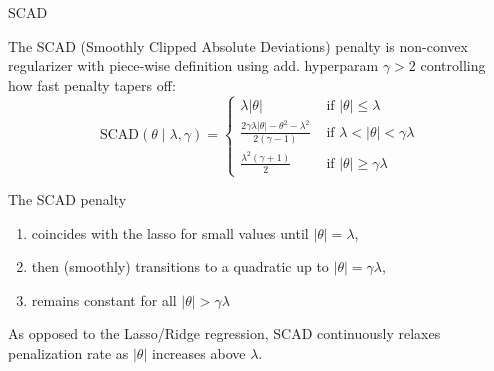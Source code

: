 \documentclass[11pt,compress,t,notes=noshow, xcolor=table]{beamer}
\begin{document}
\begin{vbframe}{SCAD }

The SCAD ({\footnotesize{Smoothly Clipped Absolute Deviations}}) penalty is non-convex regularizer with piece-wise definition using add. hyperparam $\gamma>2$ controlling how fast penalty tapers off:
$$
\text{SCAD}(\theta \mid \lambda, \gamma)= \begin{cases}\lambda|\theta| & \text { if }|\theta| \leq \lambda \\ \frac{2 \gamma \lambda|\theta|-\theta^2-\lambda^2}{2(\gamma-1)} & \text { if } \lambda<|\theta|<\gamma \lambda \\ \frac{\lambda^2(\gamma+1)}{2} & \text { if }|\theta| \geq \gamma \lambda\end{cases}
$$

The SCAD penalty 
\begin{enumerate}
    \item coincides with the lasso for small values until $|\theta|=\lambda$,
    \item then (smoothly) transitions to a quadratic up to $|\theta|=\gamma \lambda$,
    \item remains constant for all $|\theta|>\gamma \lambda$
\end{enumerate}
\vspace{0.3cm}
As opposed to the Lasso/Ridge regression, SCAD continuously relaxes penalization rate as $|\theta|$ increases above $\lambda$. %


\end{vbframe}
\end{document}
